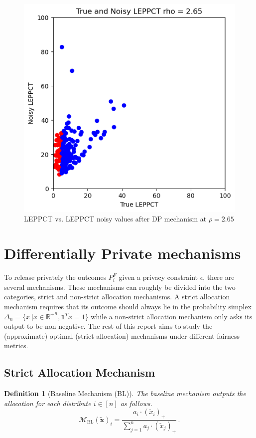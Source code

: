\documentclass[9pt,lineno,twocolumn,twoside]{pnas-new}
\newtheorem{definition}{Definition}
\newcommand{\cM}{\mathcal{M}}
\newcommand{\noisydata}{\tilde{\bm{x}}}
\newcommand{\relu}[1]{\left(#1\right)_+}
\newcommand{\blmech}[1]{\cM_{\mathrm{BL}}\left(#1\right)}
\begin{document}
    \begin{figure}[h]
        \centering
        \includegraphics[width=0.5\linewidth]{images/true_noisy_leppct_2.65.png}
        \caption{LEPPCT vs. LEPPCT noisy values after DP mechanism at $\rho=2.65$}
        \label{fig:leppct}
    \end{figure}



    \section*{Differentially Private mechanisms}
    To release privately the outcomes $P^F_i$ given a privacy constraint $\epsilon$, there are several mechanisms. These mechanisms can roughly be divided into the two categories, strict and non-strict allocation mechanisms. A strict allocation mechanism requires that
    its outcome should always lie in the probability simplex $\Delta_n = \{x \  | x \in {\mathbb{R}^{+}}^{n}, \boldsymbol{1}^T x =1 \}$ while a non-strict allocation mechanism
    only asks its output to be non-negative. The rest of this report aims to study the (approximate) optimal
    (strict allocation) mechanisms under different fairness metrics.
    \subsection*{Strict Allocation Mechanism}

    \begin{definition}
        [Baseline Mechanism (BL)]
        The \emph{baseline mechanism} outputs the allocation for each distribute $i\in [n]$ as follows.
        \begin{equation*}
            \blmech{\noisydata}_i = \frac{a_i\cdot \relu{\tilde{x}_i}}{\sum_{j=1}^n a_j\cdot \relu{\tilde{x}_j}}\,.
        \end{equation*}
    \end{definition}
\end{document}
